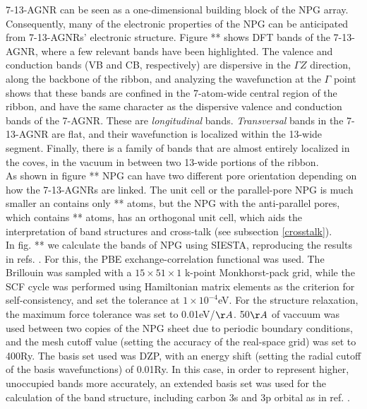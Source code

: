 7-13-AGNR can be seen as a one-dimensional building block of the NPG array. Consequently, many of the electronic properties of the NPG can be anticipated from 7-13-AGNRs' electronic structure.
Figure ** shows DFT bands of the 7-13-AGNR\parencite{Kretz2018}, where a few relevant bands have been highlighted. The valence and conduction bands (VB and CB, respectively) are dispersive in the \(\Gamma Z\) direction, along the backbone of the ribbon, and analyzing the wavefunction at the \(\Gamma\) point shows that\parencite{Kretz2018} these bands are confined in the 7-atom-wide central region of the ribbon, and have the same character as the dispersive valence and conduction bands of the 7-AGNR. These are \textit{longitudinal} bands. \textit{Transversal} 
bands in the 7-13-AGNR are flat, and their wavefunction is localized within the 13-wide segment. Finally, there is a family of bands that are almost entirely localized in the coves, in the vacuum in between two 13-wide portions of the ribbon.\\

As shown in figure ** NPG can have two different pore orientation depending on how the 7-13-AGNRs are linked. The unit cell or the parallel-pore NPG is much smaller an contains only ** atoms, but the NPG with the anti-parallel pores, which contains ** atoms, has an orthogonal unit cell, which aids the interpretation of band structures and cross-talk (see subsection \ref{crosstalk}).\\

In fig. ** we calculate the bands of NPG using SIESTA, reproducing the results in refs. \parencite{Moreno2018, Kretz2018}. For this, the PBE exchange-correlation functional was used. The Brillouin was sampled with a \(15\times51\times1\) k-point Monkhorst-pack grid, while the SCF cycle was performed using Hamiltonian matrix elements as the criterion for self-consistency, and set the tolerance at \(1\times10^{-4}\)eV. For the structure relaxation, the maximum force tolerance was set to 0.01eV/\(\AA\). 50\(\AA\) of vaccuum was used between two copies of the NPG sheet due to periodic boundary conditions, and the mesh cutoff value (setting the accuracy of the real-space grid) was set to 400Ry. The basis set used was DZP, with an energy shift (setting the radial cutoff of the basis wavefunctions) of 0.01Ry. In this case, in order to represent higher, unoccupied bands more accurately, an extended basis set was used for the calculation of the band structure, including carbon 3s and 3p orbital as in ref. \parencite{Kretz2018}.\\


